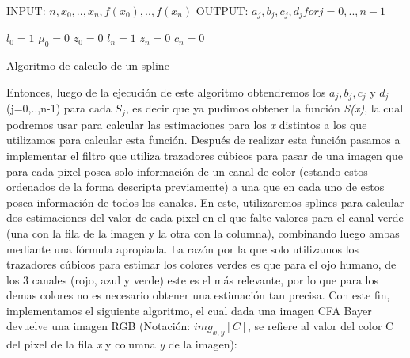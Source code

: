 \documentclass[10pt, a4paper]{article}
\begin{document}
\begin{algorithm}[H]
INPUT: $n, x_{0},..,x_{n}, f(x_{0}),..,f(x_{n})$
OUTPUT: $a_{j}, b_{j}, c_{j}, d_{j} for j =0,..,n-1$

$l_{0} = 1$
$\mu_{0} = 0$
$z_{0} = 0$
$l_{n} = 1$
$z_{n} = 0$
$c_{n} = 0$
\caption{Algoritmo de calculo de un spline}
\end{algorithm}

Entonces, luego de la ejecuci\'on de este algoritmo obtendremos los $a_{j}, b_{j}, c_{j}$ y $d_{j}$ (j=0,..,n-1) para cada $S_{j}$, es decir que ya pudimos obtener la funci\'on \textit{S(x)}, la cual podremos usar para calcular las estimaciones para los \textit{x} distintos a los que utilizamos para calcular esta funci\'on.
Despu\'es de realizar esta funci\'on pasamos a implementar el filtro que utiliza trazadores c\'ubicos para pasar de una imagen que para cada pixel posea solo informaci\'on de un canal de color (estando estos ordenados de la forma descripta previamente) a una que en cada uno de estos posea informaci\'on de todos los canales. En este, utilizaremos splines para calcular dos estimaciones del valor de cada pixel en el que falte valores para el canal verde (una con la fila de la imagen y la otra con la columna), combinando luego ambas mediante una f\'ormula apropiada. La raz\'on por la que solo utilizamos los trazadores c\'ubicos para estimar los colores verdes es que para el ojo humano, de los 3 canales (rojo, azul y verde) este es el m\'as relevante, por lo que para los demas colores no es necesario obtener una estimaci\'on tan precisa. Con este fin, implementamos el siguiente algoritmo, el cual dada una imagen CFA Bayer devuelve una imagen RGB (Notaci\'on: $img_{x,y}[C]$, se refiere al valor del color C del pixel de la fila \textit{x} y columna \textit{y} de la imagen):
\end{document}
